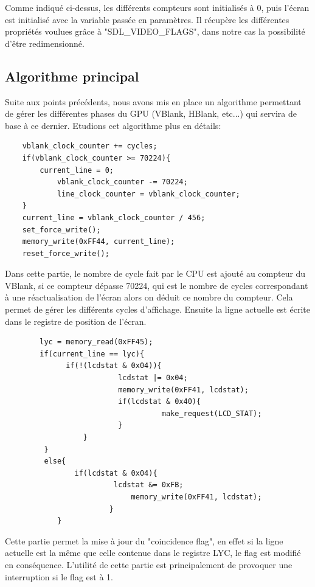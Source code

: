 \documentclass{report}
\begin{document}
Comme indiqué ci-dessus, les différents compteurs sont initialisés à 0, puis l'écran est initialisé avec la variable passée en paramètres. Il récupère les différentes propriétés voulues grâce à "SDL\_VIDEO\_FLAGS", dans notre cas la possibilité d'être redimensionné.\\

\subsection{Algorithme principal}
	Suite aux points précédents, nous avons mis en place un algorithme permettant de gérer les différentes phases du GPU (VBlank, HBlank, etc...) qui servira de base à ce dernier. Etudions cet algorithme plus en détails:\\

\begin{lstlisting}
	vblank_clock_counter += cycles;
	if(vblank_clock_counter >= 70224){
		current_line = 0;
      		vblank_clock_counter -= 70224;
        	line_clock_counter = vblank_clock_counter;
	}
	current_line = vblank_clock_counter / 456;
	set_force_write();
	memory_write(0xFF44, current_line);
	reset_force_write();
\end{lstlisting}	

Dans cette partie, le nombre de cycle fait par le CPU est ajouté au compteur du VBlank, si ce compteur dépasse 70224, qui est le nombre de cycles correspondant à une réactualisation de l'écran alors on déduit ce nombre du compteur. Cela permet de gérer les différents cycles d'affichage. Ensuite la ligne actuelle est écrite dans le registre de position de l'écran.

\begin{lstlisting}                                        
     	lyc = memory_read(0xFF45);
        if(current_line == lyc){                        
          	  if(!(lcdstat & 0x04)){                  
                       	  lcdstat |= 0x04;
                          memory_write(0xFF41, lcdstat);
                          if(lcdstat & 0x40){
    	                            make_request(LCD_STAT);
                          }
                  }
         }
         else{
             	if(lcdstat & 0x04){
       		             lcdstat &= 0xFB;
                             memory_write(0xFF41, lcdstat);
                        }
         	}

\end{lstlisting}
Cette partie permet la mise à jour du "coincidence flag", en effet si la ligne actuelle est la même que celle contenue dans le registre LYC, le flag est modifié en conséquence. L'utilité de cette partie est principalement de provoquer une interruption si le flag est à 1.
\end{document}
